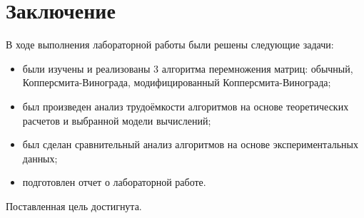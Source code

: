\chapter*{Заключение}

В ходе выполнения лабораторной работы были решены следующие задачи:

\begin{itemize}
	\item были изучены и реализованы 3 алгоритма перемножения матриц: обычный, Копперсмита-Винограда, модифицированный Копперсмита-Винограда;

	\item был произведен анализ трудоёмкости алгоритмов на основе теоретических расчетов и выбранной модели вычислений;
	\item был сделан сравнительный анализ алгоритмов на основе экспериментальных данных;

	\item подготовлен отчет о лабораторной работе.
\end{itemize}

Поставленная цель достигнута.